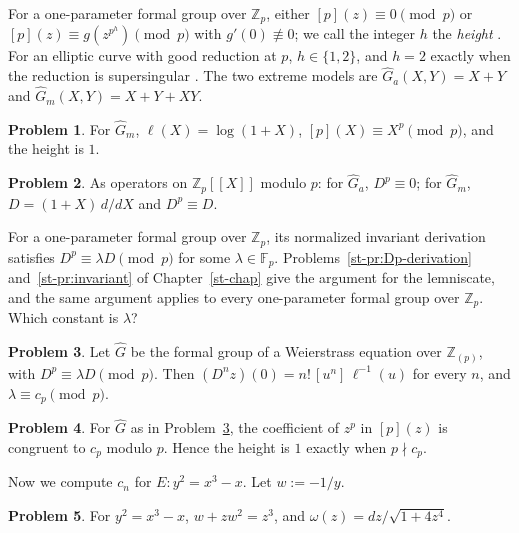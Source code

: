 \documentclass[reqno]{amsart}
\newcounter{chap}
\theoremstyle{definition}
\newtheorem{problem}{Problem}[section]
\theoremstyle{plain}
\newcommand{\Z}{\mathbb{Z}}
\newcommand{\F}{\mathbb{F}}
\begin{document}
For a one-parameter formal group over \(\Z_p\), either \([p](z) \equiv 0 \pmod p\) or \([p](z) \equiv g(z^{p^h}) \pmod p\) with \(g'(0) \not\equiv 0\); we call the integer \(h\) the \emph{height} \cite[\S IV.7]{Si1}.  For an elliptic curve with good reduction at \(p\), \(h \in \{1, 2\}\), and \(h = 2\) exactly when the reduction is supersingular \cite[Thm.~V.3.1]{Si1}.  The two extreme models are \(\hat G_a(X, Y) = X + Y\) and \(\hat G_m(X, Y) = X + Y + XY\).

\begin{problem}\label{pr:Gm}
For \(\hat G_m\), \(\ell(X) = \log(1+X)\), \([p](X) \equiv X^p \pmod p\), and the height is \(1\).
\end{problem}

\begin{problem}\label{pr:Dp-models}
As operators on \(\Z_p[[X]]\) modulo \(p\): for \(\hat G_a\), \(D^p \equiv 0\); for \(\hat G_m\), \(D = (1+X)\,d/dX\) and \(D^p \equiv D\).
\end{problem}

For a one-parameter formal group over \(\Z_p\), its normalized invariant derivation satisfies \(D^p \equiv \lambda D \pmod p\) for some \(\lambda \in \F_p\).  Problems~\ref{st-pr:Dp-derivation} and~\ref{st-pr:invariant} of Chapter~\ref{st-chap} give the argument for the lemniscate, and the same argument applies to every one-parameter formal group over \(\Z_p\).  Which constant is \(\lambda\)?

\begin{problem}\label{pr:lambda}
Let \(\hat G\) be the formal group of a Weierstrass equation over \(\Z_{(p)}\), with \(D^p \equiv \lambda D \pmod p\).  Then \((D^n z)(0) = n!\, [u^n]\, \ell^{-1}(u)\) for every \(n\), and \(\lambda \equiv c_p \pmod p\).
\end{problem}

\begin{problem}\label{pr:coef-p}
For \(\hat G\) as in Problem~\ref{pr:lambda}, the coefficient of \(z^p\) in \([p](z)\) is congruent to \(c_p\) modulo \(p\).  Hence the height is \(1\) exactly when \(p \nmid c_p\).
\end{problem}

Now we compute \(c_n\) for \(E \colon y^2 = x^3 - x\).  Let \(w := -1/y\).

\begin{problem}\label{pr:w-z}
For \(y^2 = x^3 - x\), \(w + z w^2 = z^3\), and \(\omega(z) = d z / \sqrt{1 + 4z^4}\).
\end{problem}
\end{document}
